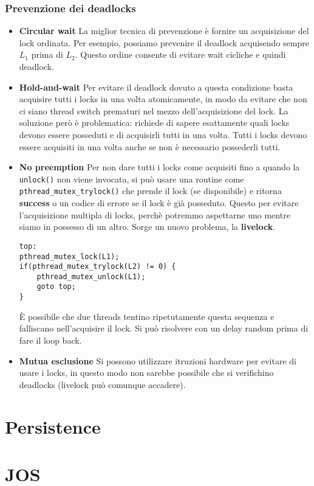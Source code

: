 \documentclass[12pt, letterpaper]{article}
\begin{document}
			\subsubsection{Prevenzione dei deadlocks}
				\begin{itemize}
					\item \textbf{Circular wait} La miglior tecnica di prevenzione è fornire un acquisizione del lock ordinata. Per esempio, possiamo prevenire il deadlock acquisendo sempre $L_1$ prima di $L_2$. Questo ordine consente di evitare wait cicliche e quindi deadlock.
					\item \textbf{Hold-and-wait} Per evitare il deadlock dovuto a questa condizione basta acquisire tutti i locks in una volta atomicamente, in modo da evitare che non ci siano thread switch prematuri nel mezzo dell'acquisizione del lock. La soluzione però è problematica: richiede di sapere esattamente quali locks devono essere posseduti e di acquisirli tutti in una volta. Tutti i locks devono essere acquisiti in una volta anche se non è necessario possederli tutti.
					\item \textbf{No preemption} Per non dare tutti i locks come acquisiti fino a quando la \texttt{unlock()} non viene invocata, si può usare una routine come \texttt{pthread\_mutex\_trylock()} che prende il lock (se disponibile) e ritorna \textbf{success} o un codice di errore se il lock è già posseduto. Questo per evitare l'acquisizione multipla di locks, perchè potremmo aspettarne uno mentre siamo in possesso di un altro. Sorge un nuovo problema, la \textbf{livelock}. 
					\begin{lstlisting}[style=CStyle]
top:
pthread_mutex_lock(L1);
if(pthread_mutex_trylock(L2) != 0) {
	pthread_mutex_unlock(L1);
	goto top;
}					\end{lstlisting}					
					È possibile che due threads tentino ripetutamente questa sequenza e falliscano nell'acquisire il lock. Si può risolvere con un delay random prima di fare il loop back.
					\item \textbf{Mutua esclusione} Si possono utilizzare itruzioni hardware per evitare di usare i locks, in questo modo non sarebbe possibile che si verifichino deadlocks (livelock può comunque accadere).
				\end{itemize}

				
			
\newpage	\section{Persistence}


	\section{JOS}
\end{document}
